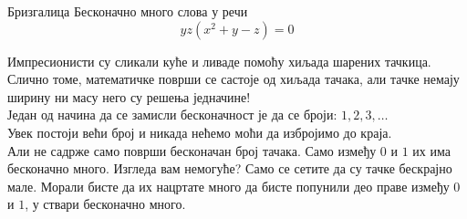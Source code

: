 \begin{surferPage}{Бризгалица}
Бесконачно много слова у речи\\
\smallskip
\[y z (x^2	+ y - z)	= 0\]

\vspace{0.3cm}
Импресионисти су сликали куће и ливаде помоћу хиљада шарених тачкица. Слично томе, математичке површи се састоје од хиљада тачака, али тачке немају ширину ни масу него су решења једначине! \\
\vspace{0.3cm}
Један од начина да се замисли бесконачност је да се броји: $1, 2, 3,\dotsc$\\
Увек постоји већи број и никада нећемо моћи да избројимо до краја.\\
\vspace{0.3cm}
Али не садрже само површи бесконачан број тачака. Само између $0$ и $1$ их има бесконачно много. Изгледа вам немогуће? Само се сетите да су тачке бескрајно мале. Морали бисте да их нацртате много да бисте попунили део праве између $0$ и $1$, у ствари бесконачно много.
\end{surferPage}
